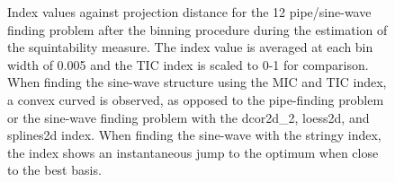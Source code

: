 \documentclass[
  number,
  preprint,
  3p]{elsarticle}
\begin{document}
\begin{figure}


\caption{\label{fig-idx-proj-dist}Index values against projection
distance for the 12 pipe/sine-wave finding problem after the binning
procedure during the estimation of the squintability measure. The index
value is averaged at each bin width of 0.005 and the TIC index is scaled
to 0-1 for comparison. When finding the sine-wave structure using the
MIC and TIC index, a convex curved is observed, as opposed to the
pipe-finding problem or the sine-wave finding problem with the
dcor2d\_2, loess2d, and splines2d index. When finding the sine-wave with
the stringy index, the index shows an instantaneous jump to the optimum
when close to the best basis.}

\end{figure}%
\end{document}
